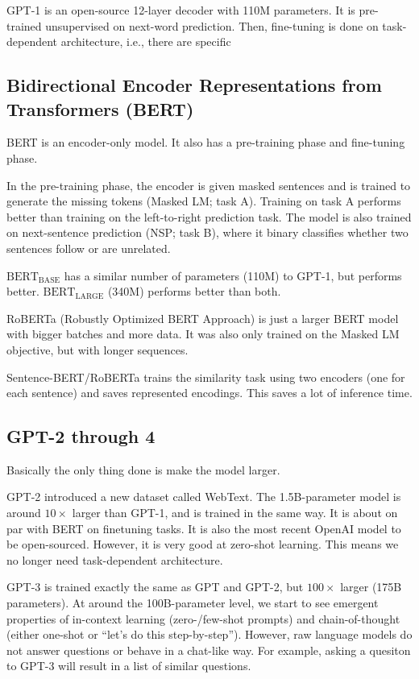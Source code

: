 \documentclass[class=cs480,notes,tikz]{agony}
\begin{document}
GPT-1 is an open-source 12-layer decoder with 110M parameters.
It is pre-trained unsupervised on next-word prediction.
Then, fine-tuning is done on task-dependent architecture, i.e.,
there are specific

\subsection*{Bidirectional Encoder Representations from Transformers (BERT)}

BERT is an encoder-only model.
It also has a pre-training phase and fine-tuning phase.

In the pre-training phase,
the encoder is given masked sentences and is trained to generate the missing tokens
(Masked LM; task A).
Training on task A performs better than training on the left-to-right prediction task.
The model is also trained on next-sentence prediction (NSP; task B),
where it binary classifies whether two sentences follow or are unrelated.

$\text{BERT}_\text{BASE}$ has a similar number of parameters (110M) to GPT-1,
but performs better.
$\text{BERT}_\text{LARGE}$ (340M) performs better than both.

RoBERTa (Robustly Optimized BERT Approach) is just a larger BERT model
with bigger batches and more data.
It was also only trained on the Masked LM objective,
but with longer sequences.

Sentence-BERT/RoBERTa trains the similarity task using two encoders
(one for each sentence) and saves represented encodings.
This saves a lot of inference time.

\subsection*{GPT-2 through 4}

Basically the only thing done is make the model larger.

GPT-2 introduced a new dataset called WebText.
The 1.5B-parameter model is around $10\times$ larger than GPT-1,
and is trained in the same way.
It is about on par with BERT on finetuning tasks.
It is also the most recent OpenAI model to be open-sourced.
However, it is very good at zero-shot learning.
This means we no longer need task-dependent architecture.

GPT-3 is trained exactly the same as GPT and GPT-2,
but $100\times$ larger (175B parameters).
At around the 100B-parameter level,
we start to see emergent properties of in-context learning (zero-/few-shot prompts)
and chain-of-thought (either one-shot or ``let's do this step-by-step'').
However, raw language models do not answer questions or behave in a chat-like way.
For example, asking a quesiton to GPT-3 will result in a list of similar questions.
\end{document}

